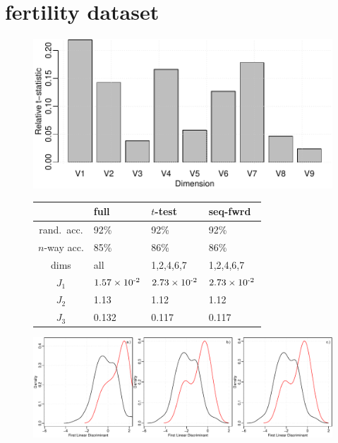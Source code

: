 \section{fertility dataset}

\begin{figure}[H]
  \begin{minipage}[b]{0.45\linewidth}
    \includegraphics[width=\linewidth]{images/fertility_ttest.pdf}
  \end{minipage}
  \hfill
  \quad
  \begin{minipage}[b]{0.45\linewidth}
    \centering
    \begin{tabular}[b]{c|lll}
      & \textbf{full} & \textbf{$t$-test} & \textbf{seq-fwrd} \\
      \hline
      rand.~acc.   & 92\%                        & 92\%       & 92\% \\ 
      $n$-way acc. & 85\%                        & 86\%       & 86\% \\
      dims         & all                         & 1,2,4,6,7  & 1,2,4,6,7 \\
      $J_1$        & $1.57 \times 10^{\textrm{-2}}$   & $2.73 \times 10^{\textrm{-2}}$ & $2.73 \times 10^{\textrm{-2}}$ \\
      $J_2$        & 1.13  & 1.12       & 1.12 \\
      $J_3$        & 0.132 & 0.117      & 0.117 \\
    \end{tabular}
    \vspace{5mm}
  \end{minipage}
  \hfill
  \vspace{5mm}
  \quad
  \begin{minipage}[t]{1.00\linewidth}
    \includegraphics[width=\linewidth]{images/fertility.pdf}

\end{minipage}
\end{figure}
